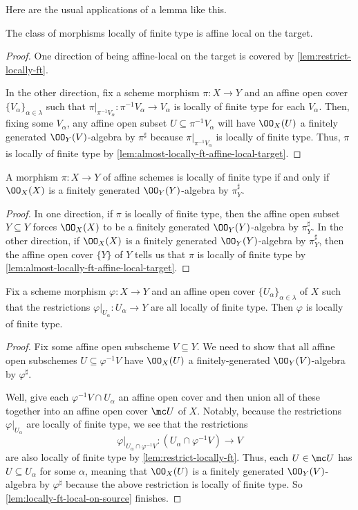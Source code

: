 \documentclass[../notes.tex]{subfiles}
\begin{document}
Here are the usual applications of a lemma like this.
\begin{corollary} \label{cor:locally-ft-affine-local-target}
	The class of morphisms locally of finite type is affine local on the target.
\end{corollary}
\begin{proof}
	One direction of being affine-local on the target is covered by \autoref{lem:restrict-locally-ft}.

	In the other direction, fix a scheme morphism $\pi\colon X\to Y$ and an affine open cover $\{V_\alpha\}_{\alpha\in\lambda}$ such that $\pi|_{\pi^{-1}V_\alpha}\colon\pi^{-1}V_\alpha\to V_\alpha$ is locally of finite type for each $V_\alpha$. Then, fixing some $V_\alpha$, any affine open subset $U\subseteq\pi^{-1}V_\alpha$ will have $\OO_X(U)$ a finitely generated $\OO_Y(V)$-algebra by $\pi^\sharp$ because $\pi|_{\pi^{-1}V_\alpha}$ is locally of finite type. Thus, $\pi$ is locally of finite type by \autoref{lem:almost-locally-ft-affine-local-target}.
\end{proof}
\begin{corollary} \label{cor:affine-locally-ft}
	A morphism $\pi\colon X\to Y$ of affine schemes is locally of finite type if and only if $\OO_X(X)$ is a finitely generated $\OO_Y(Y)$-algebra by $\pi^\sharp_Y$.
\end{corollary}
\begin{proof}
	In one direction, if $\pi$ is locally of finite type, then the affine open subset $Y\subseteq Y$ forces $\OO_X(X)$ to be a finitely generated $\OO_Y(Y)$-algebra by $\pi^\sharp_Y$. In the other direction, if $\OO_X(X)$ is a finitely generated $\OO_Y(Y)$-algebra by $\pi^\sharp_Y$, then the affine open cover $\{Y\}$ of $Y$ tells us that $\pi$ is locally of finite type by \autoref{lem:almost-locally-ft-affine-local-target}.
\end{proof}
\begin{lemma} \label{lem:locally-ft-on-source-abstract}
	Fix a scheme morphism $\varphi\colon X\to Y$ and an affine open cover $\{U_\alpha\}_{\alpha\in\lambda}$ of $X$ such that the restrictions $\varphi|_{U_\alpha}\colon U_\alpha\to Y$ are all locally of finite type. Then $\varphi$ is locally of finite type.
\end{lemma}
\begin{proof}
	Fix some affine open subscheme $V\subseteq Y$. We need to show that all affine open subschemes $U\subseteq\varphi^{-1}V$ have $\OO_X(U)$ a finitely-generated $\OO_Y(V)$-algebra by $\varphi^\sharp$.

	Well, give each $\varphi^{-1}V\cap U_\alpha$ an affine open cover and then union all of these together into an affine open cover $\mc U$ of $X$. Notably, because the restrictions $\varphi|_{U_\alpha}$ are locally of finite type, we see that the restrictions
	\[\varphi|_{U_\alpha\cap\varphi^{-1}V}\colon(U_\alpha\cap\varphi^{-1}V)\to V\]
	are also locally of finite type by \autoref{lem:restrict-locally-ft}. Thus, each $U\in\mc U$ has $U\subseteq U_\alpha$ for some $\alpha$, meaning that $\OO_X(U)$ is a finitely generated $\OO_Y(V)$-algebra by $\varphi^\sharp$ because the above restriction is locally of finite type. So \autoref{lem:locally-ft-local-on-source} finishes.
\end{proof}
\end{document}
